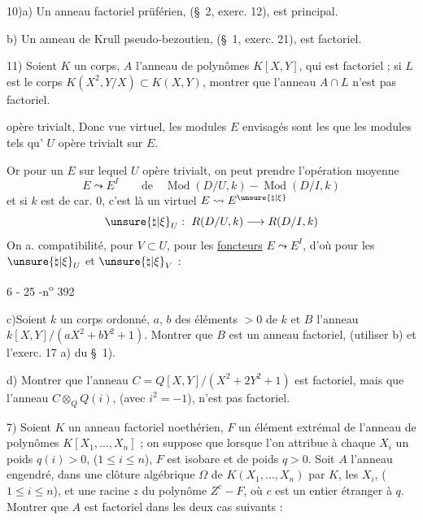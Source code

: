 10)\quad a) Un anneau factoriel prüférien, (\S\ 2, exerc. 12), est principal.

b) Un anneau de Krull pseudo-bezoutien, (\S\ 1, exerc. 21), est factoriel.

11) Soient $K$ un corps, $A$ l'anneau de polynômes $K[X,Y]$, qui est factoriel ; si $L$ est le corps $K(X^2,Y/X)\subset K(X,Y)$, montrer que l'anneau $A\cap L$ n'est pas factoriel.


opère trivialt,  Donc  vue virtuel,  les modules $E$ envisagés sont  les  que les modules tels qu' $U$ opère trivialt sur $E$.

Or pour un $E$ sur lequel $U$ opère trivialt, on peut prendre l'opération moyenne
\[
E\leadsto E^I\qquad\text{de}\quad \operatorname{Mod}(D/U,k)-\operatorname{Mod}(D/I,k)
\]
et si $k$ est de car. $0$, c'est là un    virtuel  $E\leadsto E^{\unsure{\natural|\xi}}$
\[
\unsure{\natural|\xi}_U:\ R(D/U,k)\longrightarrow R(D/I,k)
\]
On a. compatibilité, pour $V\subset U$, pour les \uline{foncteurs} $E\leadsto E^I$, d'où pour les $\unsure{\natural|\xi}_U$ et $\unsure{\natural|\xi}_V$ :


\begin{center}6 - 25 -\hfill n\textsuperscript{o} 392\end{center}

c)Soient $k$ un corps ordonné, $a$, $b$ des éléments $>0$ de $k$ et $B$ l'anneau $k[X,Y]/(aX^2+bY^2+1)$. Montrer que $B$ est un anneau factoriel, (utiliser b) et l'exerc. 17 a) du \S\ 1).

d) Montrer que l'anneau $C=Q[X,Y]/(X^2+2Y^2+1)$ est factoriel, mais que l'anneau $C\otimes_Q Q(i)$, (avec $i^2=-1$), n'est pas factoriel.

7) Soient $K$ un anneau factoriel noethérien, $F$ un élément extrémal de l'anneau de polynômes $K[X_1,\ldots,X_n]$ ; on suppose que lorsque l'on attribue à chaque $X_i$ un poids $q(i)>0$, ($1\leq i\leq n$), $F$ est isobare et de poids $q>0$. Soit $A$ l'anneau engendré, dans une clôture algébrique $\Omega$ de $K(X_1,\ldots,X_n)$ par $K$, les $X_i$, ($1\leq i\leq n$), et une racine $z$ du polynôme $Z^c-F$, où $c$ est un entier étranger à $q$. Montrer que $A$ est factoriel dans les deux cas suivants :

